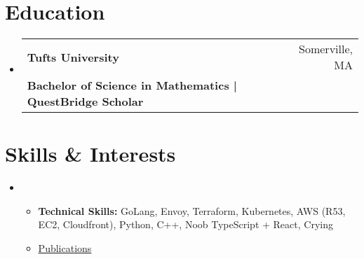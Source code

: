 \documentclass[letterpaper,11pt]{article}
\makeatletter
\newcommand{\cvitem}[1]{
  \item\small{
    {#1\vspace{-2pt}}
  }
}
\newcommand{\cvheading}[4]{
  \vspace{-2pt}\item
    \begin{tabular*}{\textwidth}[t]{l@{\extracolsep{\fill}}r}
      \textbf{#1} & #2 \\
      \small#3 & \small #4 \\
    \end{tabular*}\vspace{-9pt}  %
}
\newcommand{\cvheadingstart}{\begin{itemize}[leftmargin=0in, label={}]}
\newcommand{\cvheadingend}{\end{itemize}}
\newcommand{\cvitemstart}{\begin{itemize}\justifying}
\newcommand{\cvitemend}{\end{itemize}\vspace{-5pt}}
\makeatother
\begin{document}
\section{Education}
\cvheadingstart
  \cvheading
    {Tufts University}{Somerville, MA}
    {\textbf{Bachelor of Science in Mathematics | QuestBridge Scholar} }{}
\cvheadingend

\section{Skills \& Interests}
\cvheadingstart
\item
\cvitemstart
  \cvitem{\textbf{Technical Skills:} GoLang, Envoy, Terraform, Kubernetes, AWS (R53, EC2, Cloudfront), Python, C++, Noob TypeScript + React, Crying}
  \cvitem{\href{https://arxiv.org/}{Publications}}
\cvitemend
\cvheadingend
\end{document}
